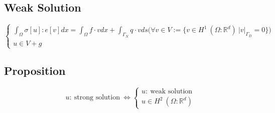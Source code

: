 \documentclass[a4paper,11pt]{article}
\newcommand{\R}{\mathbb{R}}
\begin{document}
\subsection{Weak Solution}
\begin{equation}\label{eq:weaklinear}
\begin{cases}
\int_\Omega \sigma[u] : e[v] dx = \int_\Omega f\cdot v dx + \int_{\Gamma_N} q\cdot v ds \big( \forall v \in V:= \{ v \in H^1\ (\Omega : \R^d)\ |v|_{\Gamma_D} = 0 \}\big)\\
u \in V+g
\end{cases}
\end{equation}
\subsection{Proposition}
\begin{equation*}
u:\ \text{strong solution}\ \Leftrightarrow \begin{cases}
u:\ \text{weak solution}\\
u\in H^2\ (\Omega : \R^d)
\end{cases}
\end{equation*}
\end{document}
